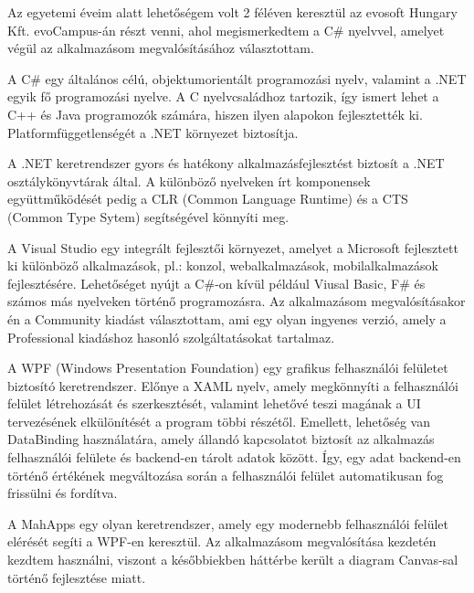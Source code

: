 


Az egyetemi éveim alatt lehetőségem volt 2 féléven keresztül az evosoft Hungary Kft. evoCampus-án részt venni, ahol megismerkedtem a C\# nyelvvel, amelyet végül az alkalmazásom megvalósításához választottam.

A C\# egy általános célú, objektumorientált programozási nyelv, valamint a .NET egyik fő programozási nyelve. A C nyelvcsaládhoz tartozik, így ismert lehet a C++ és Java programozók számára, hiszen ilyen alapokon fejlesztették ki. Platformfüggetlenségét a .NET környezet biztosítja.

A .NET keretrendszer gyors és hatékony alkalmazásfejlesztést biztosít a .NET osztálykönyvtárak által. A különböző nyelveken írt komponensek együttműködését pedig a CLR (Common Language Runtime) és a CTS (Common Type Sytem) segítségével könnyíti meg.\cite{csharp}


A Visual Studio egy integrált fejlesztői környezet, amelyet a Microsoft fejlesztett ki különböző alkalmazások, pl.: konzol, webalkalmazások, mobilalkalmazások fejlesztésére. Lehetőséget nyújt a C\#-on kívül például Viusal Basic, F\# és számos más nyelveken történő programozásra.  Az alkalmazásom megvalósításakor én a Community kiadást választottam, ami egy olyan ingyenes verzió, amely a Professional kiadáshoz hasonló szolgáltatásokat tartalmaz.\cite{vs}


A WPF (Windows Presentation Foundation) egy grafikus felhasználói felületet biztosító keretrendszer. Előnye a XAML nyelv, amely megkönnyíti a felhasználói felület létrehozását és szerkesztését, valamint lehetővé teszi magának a UI tervezésének elkülönítését a program többi részétől. Emellett, lehetőség van DataBinding használatára, amely állandó kapcsolatot biztosít az alkalmazás felhasználói felülete és backend-en tárolt adatok között. Így, egy adat backend-en történő értékének megváltozása során a felhasználói felület automatikusan fog frissülni és fordítva.\cite{wpf}\cite{databinding}

A MahApps egy olyan keretrendszer, amely egy modernebb felhasználói felület elérését segíti a WPF-en keresztül. Az alkalmazásom megvalósítása kezdetén kezdtem használni, viszont a későbbiekben háttérbe került a diagram Canvas-sal történő fejlesztése miatt.

